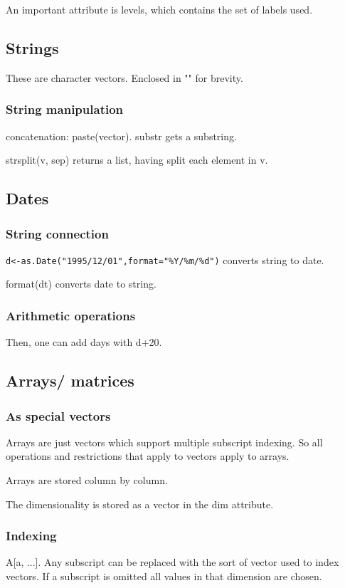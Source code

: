 \documentclass[oneside, article]{memoir}
\begin{document}
An important attribute is levels, which contains the set of labels used.

\subsection{Strings}
These are character vectors. Enclosed in "" for brevity.

\subsubsection{String manipulation}
concatenation: paste(vector). substr gets a substring.

strsplit(v, sep) returns a list, having split each element in v.

\subsection{Dates}
\subsubsection{String connection}
\verb'd<-as.Date("1995/12/01",format="%Y/%m/%d")' converts string to date.

format(dt) converts date to string.

\subsubsection{Arithmetic operations}
Then, one can add days with d+20.

\subsection{Arrays/ matrices}
\subsubsection{As special vectors}
Arrays are just vectors which support multiple subscript indexing. So all operations and restrictions that apply to vectors apply to arrays.

Arrays are stored column by column.

The dimensionality is stored as a vector in the dim attribute.

\subsubsection{Indexing}
A[a, ...]. Any subscript can be replaced with the sort of vector used to index vectors. If a subscript is omitted all values in that dimension are chosen.
\end{document}
